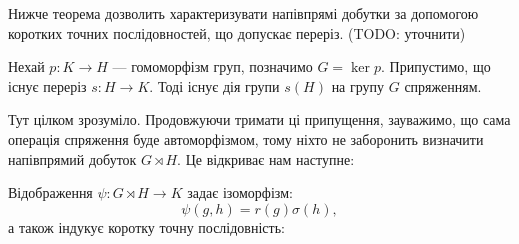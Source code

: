 \documentclass{math_library}
\begin{document}
Нижче теорема дозволить характеризувати напівпрямі добутки за допомогою коротких точних послідовностей, що допускає переріз. (TODO: уточнити)

\begin{lemma}
Нехай $p \colon K \to H$ --- гомоморфізм груп, позначимо $G = \ker p$. Припустимо, що існує переріз $s \colon H \to K$. Тоді існує дія групи $s(H)$ на групу $G$ спряженням.
\end{lemma}

Тут цілком зрозуміло. Продовжуючи тримати ці припущення, зауважимо, що сама операція спряження буде автоморфізмом, тому ніхто не заборонить визначити напівпрямий добуток $G \rtimes H$. Це відкриває нам наступне:

\begin{theorem}
Відображення $\psi \colon G \rtimes H \to K$ задає ізоморфізм:
\[
\psi(g,h) = r(g) \sigma(h),
\]
а також індукує коротку точну послідовність:
\begin{figure}[H]
\centering
{}
\end{figure}
\end{theorem}
\newpage
\end{document}
